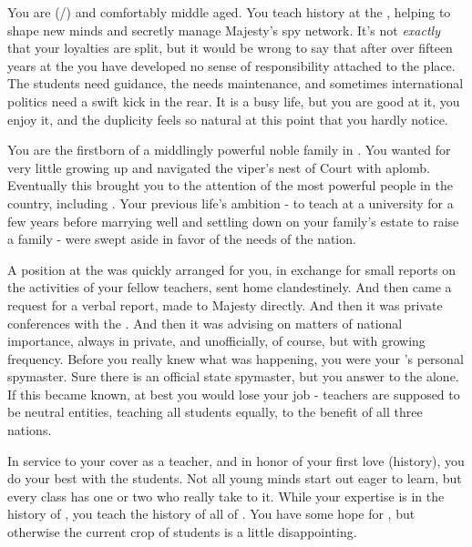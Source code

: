 \documentclass[char]{GL2020}
\begin{document}
\name{\cHistory{}}


You are \cHistory{} (\cHistory{\they}/\cHistory{\them}) and comfortably middle aged. You teach history at the \pSchool{}, helping to shape new minds and secretly manage \cQueen{\Their} Majesty’s spy network. It’s not \emph{exactly} that your loyalties are split, but it would be wrong to say that after over fifteen years at the \pSchool{} you have developed no sense of responsibility attached to the place. The students need guidance, the \pSc{} needs maintenance, and sometimes international politics need a swift kick in the rear. It is a busy life, but you are good at it, you enjoy it, and the duplicity feels so natural at this point that you hardly notice.

You are the firstborn \cHistory{\child} of a middlingly powerful noble family in \pFarm{}. You wanted for very little growing up and navigated the viper’s nest of Court with aplomb. Eventually this brought you to the attention of the most powerful people in the country, including \cQueen{\Majesty} \cQueen{} \cQueen{\themself}. Your previous life’s ambition - to teach at a \pFarm{} university for a few years before marrying well and settling down on your family’s estate to raise a family - were swept aside in favor of the needs of the nation.

A position at the \pSchool{} was quickly arranged for you, in exchange for small reports on the activities of your fellow teachers, sent home clandestinely. And then came a request for a verbal report, made to \cQueen{\Their} Majesty directly. And then it was private conferences with the \cQueen{\Majesty}. And then it was advising \cQueen{\them} on matters of national importance, always in private, and unofficially, of course, but with growing frequency. Before you really knew what was happening, you were your \cQueen{\Majesty}’s personal spymaster. Sure there is an official state spymaster, but you answer to the \cQueen{\Majesty} alone. If this became known, at best you would lose your job - teachers are supposed to be neutral entities, teaching all students equally, to the benefit of all three nations.

In service to your cover as a teacher, and in honor of your first love (history), you do your best with the students. Not all young minds start out eager to learn, but every class has one or two who really take to it. While your expertise is in the history of \pFarm{}, you teach the history of all of \pEarth{}. You have some hope for \cLibAssist{}, but otherwise the current crop of students is a little disappointing.
\end{document}
